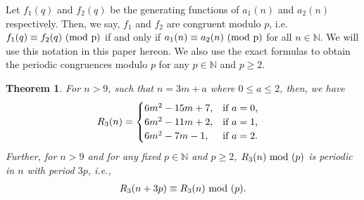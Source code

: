 \documentclass[12pt,reqno]{amsart}
\numberwithin{equation}{section}
\theoremstyle{plain}
\newtheorem{theorem}{Theorem}[section]
\begin{document}
	Let $f_1(q)$ and $f_2(q)$ be the generating functions of $a_1(n)$ and $a_2(n)$ respectively. Then, we say, $f_1$ and $f_2$ are congruent modulo $p$, i.e. $f_1(q) \equiv f_2(q) \textup{ (mod p)}$ if and only if $a_1(n) \equiv a_2(n) \textup{ (mod p)}$ for all $n \in \mathbb{N}$. We will use this notation in this paper hereon. We also use the exact formulas to obtain the periodic congruences modulo $p$ for any $p \in \mathbb{N}$ and $p\geq2$.
	\begin{theorem}\label{R3thmexk} 
		For $n>9$, such that $n=3m+a$ where $0\leq a\leq 2$, then, we have
		\begin{align}\label{R3formula}
			R_3(n) &=
			\begin{cases}
				6m^2 -15m+7, & \textup{if $a=0$,}\\
				6m^2 -11m+2, & \textup{if $a=1$,}\\
				6m^2 -7m-1, & \textup{if $a=2$.}
			\end{cases}
		\end{align}
		Further, for $n>9$ and for any fixed $p \in \mathbb{N}$ and $p\geq2$, $R_3(n) \textup{ mod }(p)$ is periodic in $n$ with period $3p$, i.e.,
		\begin{align*}
			R_3(n+3p) \equiv R_3(n) \textup{ mod } (p).
		\end{align*}
	\end{theorem}
\end{document}

